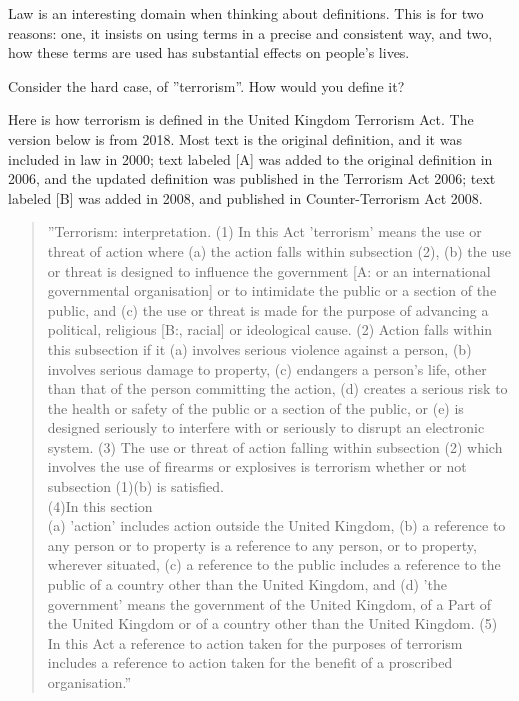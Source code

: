 \documentclass[graybox,envcountchap,sectrefs]{svmono}
\begin{document}
Law is an interesting domain when thinking about definitions. This is for two reasons: one, it insists on using terms in a precise and consistent way, and two, how these terms are used has substantial effects on people's lives.

Consider the hard case, of ''terrorism''. How would you define it?

Here is how terrorism is defined in the United Kingdom Terrorism Act. The version below is from 2018. Most text is the original definition, and it was included in law in 2000; text labeled [A] was added to the original definition in 2006, and the updated definition was published in the Terrorism Act 2006; text labeled [B] was added in 2008, and published in Counter-Terrorism Act 2008.

\begin{quote}
''Terrorism: interpretation.
(1) In this Act 'terrorism' means the use or threat of action where 
(a) the action falls within subsection (2), 
(b) the use or threat is designed to influence the government [A: or an international governmental organisation] or to intimidate the public or a section of the public, and 
(c) the use or threat is made for the purpose of advancing a political, religious [B:, racial] or ideological cause. 
(2) Action falls within this subsection if it 
(a) involves serious violence against a person, 
(b) involves serious damage to property, 
(c) endangers a person's life, other than that of the person committing the action,
(d) creates a serious risk to the health or safety of the public or a section of the public, or 
(e) is designed seriously to interfere with or seriously to disrupt an electronic system. 
(3) The use or threat of action falling within subsection (2) which involves the use of firearms or explosives is terrorism whether or not subsection (1)(b) is satisfied. \\
(4)In this section \\
(a) 'action' includes action outside the United Kingdom, 
(b) a reference to any person or to property is a reference to any person, or to property, wherever situated, 
(c) a reference to the public includes a reference to the public of a country other than the United Kingdom, and 
(d) 'the government' means the government of the United Kingdom, of a Part of the United Kingdom or of a country other than the United Kingdom. 
(5) In this Act a reference to action taken for the purposes of terrorism includes a reference to action taken for the benefit of a proscribed organisation.'' \cite{uk-terrorism-act}
\end{quote}
\end{document}
